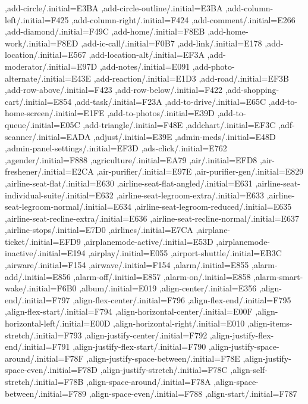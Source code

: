 { ,add-circle/.initial=E3BA
 ,add-circle-outline/.initial=E3BA
 ,add-column-left/.initial=F425
 ,add-column-right/.initial=F424
 ,add-comment/.initial=E266
 ,add-diamond/.initial=F49C
 ,add-home/.initial=F8EB
 ,add-home-work/.initial=F8ED
 ,add-ic-call/.initial=F0B7
 ,add-link/.initial=E178
 ,add-location/.initial=E567
 ,add-location-alt/.initial=EF3A
 ,add-moderator/.initial=E97D
 ,add-notes/.initial=E091
 ,add-photo-alternate/.initial=E43E
 ,add-reaction/.initial=E1D3
 ,add-road/.initial=EF3B
 ,add-row-above/.initial=F423
 ,add-row-below/.initial=F422
 ,add-shopping-cart/.initial=E854
 ,add-task/.initial=F23A
 ,add-to-drive/.initial=E65C
 ,add-to-home-screen/.initial=E1FE
 ,add-to-photos/.initial=E39D
 ,add-to-queue/.initial=E05C
 ,add-triangle/.initial=F48E
 ,addchart/.initial=EF3C
 ,adf-scanner/.initial=EADA
 ,adjust/.initial=E39E
 ,admin-meds/.initial=E48D
 ,admin-panel-settings/.initial=EF3D
 ,ads-click/.initial=E762
 ,agender/.initial=F888
 ,agriculture/.initial=EA79
 ,air/.initial=EFD8
 ,air-freshener/.initial=E2CA
 ,air-purifier/.initial=E97E
 ,air-purifier-gen/.initial=E829
 ,airline-seat-flat/.initial=E630
 ,airline-seat-flat-angled/.initial=E631
 ,airline-seat-individual-suite/.initial=E632
 ,airline-seat-legroom-extra/.initial=E633
 ,airline-seat-legroom-normal/.initial=E634
 ,airline-seat-legroom-reduced/.initial=E635
 ,airline-seat-recline-extra/.initial=E636
 ,airline-seat-recline-normal/.initial=E637
 ,airline-stops/.initial=E7D0
 ,airlines/.initial=E7CA
 ,airplane-ticket/.initial=EFD9
 ,airplanemode-active/.initial=E53D
 ,airplanemode-inactive/.initial=E194
 ,airplay/.initial=E055
 ,airport-shuttle/.initial=EB3C
 ,airware/.initial=F154
 ,airwave/.initial=F154
 ,alarm/.initial=E855
 ,alarm-add/.initial=E856
 ,alarm-off/.initial=E857
 ,alarm-on/.initial=E858
 ,alarm-smart-wake/.initial=F6B0
 ,album/.initial=E019
 ,align-center/.initial=E356
 ,align-end/.initial=F797
 ,align-flex-center/.initial=F796
 ,align-flex-end/.initial=F795
 ,align-flex-start/.initial=F794
 ,align-horizontal-center/.initial=E00F
 ,align-horizontal-left/.initial=E00D
 ,align-horizontal-right/.initial=E010
 ,align-items-stretch/.initial=F793
 ,align-justify-center/.initial=F792
 ,align-justify-flex-end/.initial=F791
 ,align-justify-flex-start/.initial=F790
 ,align-justify-space-around/.initial=F78F
 ,align-justify-space-between/.initial=F78E
 ,align-justify-space-even/.initial=F78D
 ,align-justify-stretch/.initial=F78C
 ,align-self-stretch/.initial=F78B
 ,align-space-around/.initial=F78A
 ,align-space-between/.initial=F789
 ,align-space-even/.initial=F788
 ,align-start/.initial=F787
}
